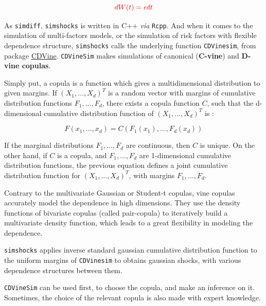 \documentclass[a4paper]{article}\usepackage[]{graphicx}\usepackage[]{color}
\newcommand{\code}[1]{\mbox{\texttt{#1}}}
\begin{document}
\begin{equation}
\textcolor{red}{dW(t) = \epsilon dt}
\end{equation}

\medskip

As \code{simdiff}, \code{simshocks} is written in C++ \textit{via} \code{Rcpp}. And when it comes to the simulation of multi-factors models, or the simulation of risk factors with flexible dependence structure, \code{simshocks} calls the underlying function \code{CDVinesim}, from package \href{http://cran.r-project.org/web/packages/CDVine/index.html}{CDVine}. \code{CDVineSim} makes simulations of canonical ({\bf C-vine}) and {\bf D-vine copulas}. 

\medskip

Simply put, a copula is a function which gives a multidimensional distribution to given margins. If $(X_1, \ldots, X_d)^T$ is a random vector with margins of cumulative distribution functions $F_1, \ldots, F_d$, there exists a copula  function $C$, such that the d-dimensional cumulative distribution function of $(X_1, \ldots, X_d)^T$ is :

\begin{equation}
F(x_1, \ldots, x_d) = C(F_1(x_1), \ldots, F_d(x_d))
\end{equation}


If the marginal distributions $F_1, \ldots, F_d$ are continuous, then $C$ is unique. On the other hand, if $C$ is a copula, and $F_1, \ldots, F_d$ are 1-dimensional cumulative distribution functions, the previous equation defines a joint cumulative distribution function for $(X_1, \ldots, X_d)^T$, with margins $F_1, \ldots, F_d$.

\medskip

Contrary to the multivariate Gaussian or Student-t copulas, vine copulas accurately model the dependence in high dimensions. They use the density functions of bivariate copulas (called pair-copula) to iteratively build a multivariate density function, which leads to a great flexibility in modeling the dependence.  

\medskip

\code{simshocks} applies inverse standard gaussian cumulative distribution function to the uniform margins of \code{CDVinesim} to obtains gaussian shocks, with various dependence structures between them. 

\medskip

\code{CDVineSim} can be used first, to choose the copula, and make an inference on it. Sometimes, the choice of the relevant copula is also made with expert knowledge. 
\end{document}
